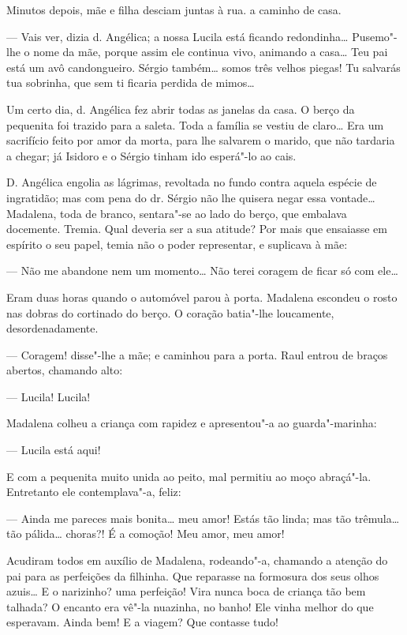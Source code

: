 Minutos depois, mãe e filha desciam juntas à rua. a caminho de casa.

--- Vais ver, dizia d. Angélica; a nossa Lucila está ficando
redondinha\ldots{} Pusemo"-lhe o nome da mãe, porque assim ele continua vivo,
animando a casa\ldots{} Teu pai está um avô candongueiro. Sérgio também\ldots{}
somos três velhos piegas! Tu salvarás tua sobrinha, que sem ti ficaria
perdida de mimos\ldots{}

Um certo dia, d. Angélica fez abrir todas as janelas da casa. O berço da
pequenita foi trazido para a saleta. Toda a família se vestiu de
claro\ldots{} Era um sacrifício feito por amor da morta, para lhe salvarem o
marido, que não tardaria a chegar; já Isidoro e o Sérgio tinham ido
esperá"-lo ao cais.

D. Angélica engolia as lágrimas, revoltada no fundo contra aquela
espécie de ingratidão; mas com pena do dr. Sérgio não lhe quisera negar
essa vontade\ldots{} Madalena, toda de branco, sentara"-se ao lado do berço,
que embalava docemente. Tremia. Qual deveria ser a sua atitude? Por mais
que ensaiasse em espírito o seu papel, temia não o poder representar, e
suplicava à mãe:

--- Não me abandone nem um momento\ldots{} Não terei coragem de ficar só com
ele\ldots{}

Eram duas horas quando o automóvel parou à porta. Madalena escondeu o
rosto nas dobras do cortinado do berço. O coração batia"-lhe loucamente,
desordenadamente.

--- Coragem! disse"-lhe a mãe; e caminhou para a porta. Raul entrou de
braços abertos, chamando alto:

--- Lucila! Lucila!

Madalena colheu a criança com rapidez e apresentou"-a ao guarda"-marinha:

--- Lucila está aqui!

E com a pequenita muito unida ao peito, mal permitiu ao moço abraçá"-la.
Entretanto ele contemplava"-a, feliz:

--- Ainda me pareces mais bonita\ldots{} meu amor! Estás tão linda; mas tão
trêmula\ldots{} tão pálida\ldots{} choras?! É a comoção! Meu amor, meu amor!

Acudiram todos em auxílio de Madalena, rodeando"-a, chamando a atenção do
pai para as perfeições da filhinha. Que reparasse na formosura dos seus
olhos azuis\ldots{} E o narizinho? uma perfeição! Vira nunca boca de criança
tão bem talhada? O encanto era vê"-la nuazinha, no banho! Ele vinha
melhor do que esperavam. Ainda bem! E a viagem? Que contasse tudo!

